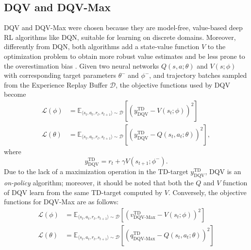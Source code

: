 \subsection{DQV and DQV-Max}
DQV and DQV-Max were chosen because they are model-free, value-based
deep RL algorithms like DQN, suitable for learning on discrete
domains. Moreover, differently from DQN, both algorithms add
a state-value function $V$ to the optimization problem to
obtain more robust value estimates and be less prone to the
overestimation bias \citep{sabatelli2020deep}. Given two neural
networks $Q\left(s,a;\theta\right)$ and $V\left(s;\phi\right)$
with corresponding target parameters $\theta^-$ and $\phi^-$, and
trajectory batches sampled from the Experience Replay Buffer
$\mathcal{D}$, the objective functions used by DQV become
\begin{align}
\mathcal{L}\left(\phi\right)&=\mathbb{E}_{\langle
                              s_t,a_t,r_t,s_{t+1}\rangle\sim
                              \mathcal{D}}\left[{\left(y^{\scriptscriptstyle
                              \textrm{TD}}_{\scriptscriptstyle
                              \textrm{DQV}}-V\left(s_t;\phi\right)\right)}^2\right]\label{eq:dqv_loss_0}
  \\
\mathcal{L}\left(\theta\right)&=\mathbb{E}_{\langle
                                s_t,a_t,r_t,s_{t+1}\rangle\sim
                                \mathcal{D}}\left[{\left(y^{\scriptscriptstyle
                                \textrm{TD}}_{\scriptscriptstyle
                                \textrm{DQV}}-Q\left(s_t,a_t;\theta\right)\right)}^2\right],\label{eq:dqv_loss_1}
\end{align}
where
\begin{equation}
  y^{\scriptscriptstyle \textrm{TD}}_{\scriptscriptstyle
    \textrm{DQV}}=r_t+\gamma V\left(s_{t+1};\phi^{-}\right).
\end{equation}
Due to the lack of a maximization operation in the TD-target
$y^{\scriptscriptstyle \textrm{TD}}_{\scriptscriptstyle
  \textrm{DQV}}$, DQV is an \textit{on-policy} algorithm; moreover, it
should
be noted that both the $Q$ and $V$ function of DQV learn from the same
TD-target computed by $V$. Conversely, the objective functions for
DQV-Max are as follows:
\begin{align}
\mathcal{L}\left(\phi\right)&=\mathbb{E}_{\langle
                              s_t,a_t,r_t,s_{t+1}\rangle\sim
                              \mathcal{D}}\left[{\left(v^{\scriptscriptstyle
                              \textrm{TD}}_{\scriptscriptstyle
                              \textrm{DQV-Max}}-V\left(s_t;\phi\right)\right)}^2\right]
  \\
\mathcal{L}\left(\theta\right)&=\mathbb{E}_{\langle
                                s_t,a_t,r_t,s_{t+1}\rangle\sim
                                \mathcal{D}}\left[{\left(q^{\scriptscriptstyle
                                \textrm{TD}}_{\scriptscriptstyle
                                \textrm{DQV-Max}}-Q\left(s_t,a_t;\theta\right)\right)}^2\right]
\end{align}
